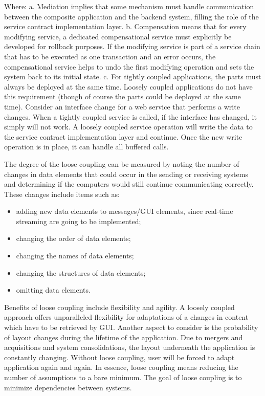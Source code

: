 Where: 
\newline
a. Mediation implies that some mechanism must handle communication between the composite application and the backend system, filling the role of the service contract implementation layer.
\newline
b. Compensation means that for every modifying service, a dedicated compensational service must explicitly be developed for rollback purposes. If the modifying service is part of a service chain that has to be executed as one transaction and an error occurs, the compensational service helps to undo the first modifying operation and sets the system back to its initial state. 
\newline
c. For tightly coupled applications, the parts must always be deployed at the same time. Loosely coupled applications do not have this requirement (though of course the parts could be deployed at the same time). Consider an interface change for a web service that performs a write changes. When a tightly coupled service is called, if the interface has changed, it simply will not work. A loosely coupled service operation will write the data to the service contract implementation layer and continue. Once the new write operation is in place, it can handle all buffered calls. 

The degree of the loose coupling can be measured by noting the number of changes in data elements that could occur in the sending or receiving systems and determining if the computers would still continue communicating correctly\cite{firestone1984study,danneels2003tight}. These changes include items such as:
\begin{itemize}
\item adding new data elements to messages/GUI elements, since real-time streaming are going to be implemented;
\item changing the order of data elements;
\item changing the names of data elements;
\item changing the structures of data elements;
\item omitting data elements.
\end{itemize}

	Benefits of loose coupling include flexibility and agility. A loosely coupled approach offers unparalleled flexibility for adaptations of a changes in content which have to be retrieved by GUI. Another aspect to consider is the probability of layout changes during the lifetime of the application. Due to mergers and acquisitions and system consolidations, the layout underneath the application is constantly changing. Without loose coupling, user will be forced to adapt application again and again. In essence, loose coupling means reducing the number of assumptions to a bare minimum. The goal of loose coupling is to minimize dependencies between systems. 


